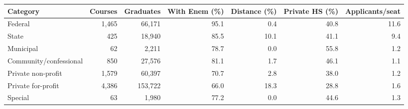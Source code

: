 \begin{tabular}{lrrrrrr}
\toprule
Category & Courses & Graduates & With Enem (\%) & Distance (\%) & Private HS (\%) & Applicants/seat \\
\midrule
Federal & 1{,}465 & 66{,}171 & 95.1 & 0.4 & 40.8 & 11.6 \\
State & 425 & 18{,}940 & 85.5 & 10.1 & 41.1 & 9.4 \\
Municipal & 62 & 2{,}211 & 78.7 & 0.0 & 55.8 & 1.2 \\
Community/confessional & 850 & 27{,}576 & 81.1 & 1.7 & 46.1 & 1.1 \\
Private non-profit & 1{,}579 & 60{,}397 & 70.7 & 2.8 & 38.0 & 1.2 \\
Private for-profit & 4{,}386 & 153{,}722 & 66.0 & 18.3 & 28.8 & 1.6 \\
Special & 63 & 1{,}980 & 77.2 & 0.0 & 44.6 & 1.3 \\
\bottomrule
\end{tabular}